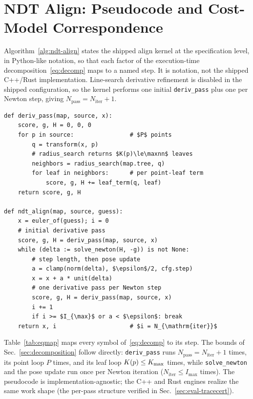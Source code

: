 \appendices
\section{NDT Align: Pseudocode and Cost-Model Correspondence}
\label{app:pseudocode}
Algorithm~\ref{alg:ndt-align} states the shipped \ndt{} align kernel at the specification
level, in Python-like notation, so that each
factor of the execution-time decomposition~\eqref{eq:decomp} maps to a named step. It is
notation, not the shipped C++/Rust implementation.
Line-search derivative refinement is disabled in the shipped configuration, so the kernel
performs one initial \texttt{deriv\_pass} plus one per Newton step, giving
$N_{\mathrm{pass}}=N_{\mathrm{iter}}+1$.

\begin{algorithm}[t]
\caption{The shipped serial \ndt{} align kernel (Python-style pseudocode). \texttt{cfg}
holds $I_{\max}$, $\epsilon$ (\texttt{trans\_epsilon}), and the step-size cap.}
\label{alg:ndt-align}
\begin{lstlisting}[style=pypseudo]
def deriv_pass(map, source, x):
    score, g, H = 0, 0, 0
    for p in source:                # $P$ points
        q = transform(x, p)
        # radius_search returns $K(p)\le\maxnn$ leaves
        neighbors = radius_search(map.tree, q)
        for leaf in neighbors:      # per point-leaf term
            score, g, H += leaf_term(q, leaf)
    return score, g, H

def ndt_align(map, source, guess):
    x = euler_of(guess); i = 0
    # initial derivative pass
    score, g, H = deriv_pass(map, source, x)
    while (delta := solve_newton(H, -g)) is not None:
        # step length, then pose update
        a = clamp(norm(delta), $\epsilon$/2, cfg.step)
        x = x + a * unit(delta)
        # one derivative pass per Newton step
        score, g, H = deriv_pass(map, source, x)
        i += 1
        if i >= $I_{\max}$ or a < $\epsilon$: break
    return x, i                     # $i = N_{\mathrm{iter}}$
\end{lstlisting}
\end{algorithm}

Table~\ref{tab:eqmap} maps every symbol of~\eqref{eq:decomp} to its step. The bounds
of Sec.~\ref{sec:decomposition} follow directly: \texttt{deriv\_pass} runs
$N_{\mathrm{pass}}=N_{\mathrm{iter}}+1$ times, its point loop $P$ times, and its leaf loop
$K(p)\le K_{\max}$ times, while \texttt{solve\_newton} and the pose update run once per
Newton iteration ($N_{\mathrm{iter}}\le I_{\max}$ times). The pseudocode is
implementation-agnostic; the C++ and Rust engines realize the same work shape (the
per-pass structure verified in Sec.~\ref{sec:eval-tracecert}).

